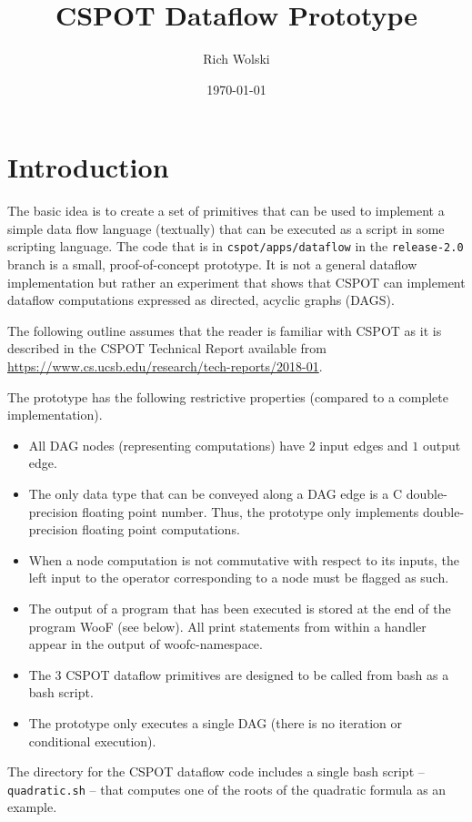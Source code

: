 \documentclass[10pt]{article}
\title{CSPOT Dataflow Prototype}
\author{Rich Wolski}
\date{\today}
\begin{document}
\maketitle

\section{Introduction}

The basic idea is to create a set of primitives that can be used to implement
a simple data flow language (textually) that can be executed as a script in
some scripting language.  The code that is in \verb+cspot/apps/dataflow+ in
the \verb+release-2.0+ branch is a
small, proof-of-concept prototype.  It is not a general dataflow
implementation but rather an experiment that shows that CSPOT can implement
dataflow computations expressed as directed, acyclic graphs (DAGS).

The following outline assumes that the reader is familiar with CSPOT as it is
described in the CSPOT Technical Report available from
\url{https://www.cs.ucsb.edu/research/tech-reports/2018-01}.

The prototype has the following restrictive properties (compared to a complete
implementation).
\begin{itemize}
\item All DAG nodes (representing computations) have $2$ input edges and $1$
output edge.
\item The only data type that can be conveyed along a DAG edge is a C
double-precision floating point number.  Thus, the prototype only implements
double-precision floating point computations.
\item When a node computation is not commutative with respect to its inputs,
the left input to the operator corresponding to a node must be flagged as
such.
\item The output of a program that has been executed is stored at the end of
the program WooF (see below).  All print statements from within a handler
appear in the output of woofc-namespace. 
\item The $3$ CSPOT dataflow primitives are designed to be called from bash as
a bash script.
\item The prototype only executes a single DAG (there is no iteration or
conditional execution).
\end{itemize}
The directory for the CSPOT dataflow code includes a single bash script --
\verb+quadratic.sh+ -- that computes one of the roots of the quadratic
formula as an example.
\end{document}
